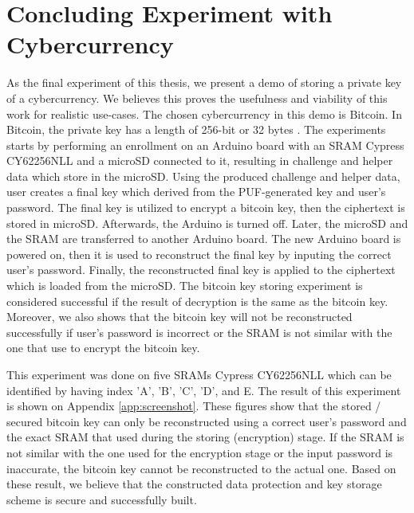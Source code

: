 \section{Concluding Experiment with Cybercurrency}
As the final experiment of this thesis, we present a demo of storing a private key of a cybercurrency. We believes this proves the usefulness and viability of this work for realistic use-cases. The chosen cybercurrency in this demo is Bitcoin. In Bitcoin, the private key has a length of 256-bit or 32 bytes \cite{bitcoin_key}. The experiments starts by performing an enrollment on an Arduino board with an SRAM Cypress CY62256NLL and a microSD connected to it, resulting in challenge and helper data which store in the microSD. Using the produced challenge and helper data, user creates a final key which derived from the PUF-generated key and user's password. The final key is utilized to encrypt a bitcoin key, then the ciphertext is stored in microSD. Afterwards, the Arduino is turned off.
Later, the microSD and the SRAM are transferred to another Arduino board. The new Arduino board is powered on, then it is used to reconstruct the final key by inputing the correct user's password. Finally, the reconstructed final key is applied to the ciphertext which is loaded from the microSD. The bitcoin key storing experiment is considered successful if the result of decryption is the same as the bitcoin key.
Moreover, we also shows that the bitcoin key will not be reconstructed successfully if user's password is incorrect or the SRAM is not similar with the one that use to encrypt the bitcoin key.

This experiment was done on five SRAMs Cypress CY62256NLL which can be identified by having index 'A', 'B', 'C', 'D', and E.
The result of this experiment is shown on Appendix \ref{app:screenshot}. These figures show that the stored / secured bitcoin key can only be reconstructed using a correct user's password and the exact SRAM that used during the storing (encryption) stage. If the SRAM is not similar with the one used for the encryption stage or the input password is inaccurate, the bitcoin key cannot be reconstructed to the actual one.
Based on these result, we believe that the constructed data protection and key storage scheme is secure and successfully built.

